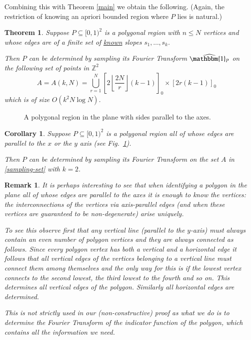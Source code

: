 \documentclass[12pt,a4paper,oneside]{amsart}
\newtheorem{theorem}{Theorem}[section]
\newtheorem{corollary}{Corollary}[section]
\newtheorem{remark}{Remark}[section]
\theoremstyle{definition}
\newcommand{\Floor}[1]{{\left\lfloor{#1}\right\rfloor}}
\newcommand{\ZZ}{{\mathbb Z}}
\newcommand{\one}{{\mathbbm{1}}}
\newcommand{\ft}[1]{\widehat{#1}}
\newcommand{\red}[1]{{#1}}
\newcounter{rem}
\begin{document}
Combining this with Theorem \ref{main} we obtain the following.
\red{(Again, the restriction of knowing an apriori bounded region where $P$ lies is natural.)}

\begin{theorem}\label{polygons}
Suppose $P \subseteq [0, 1)^2$ is a polygonal region with $n \le N$ vertices and whose edges are of a finite set of \underline{known} slopes $s_1, \ldots, s_k$.

Then $P$ can be determined by sampling its Fourier Transform $\ft{\one_P}$ on the following set of points in $\ZZ^2$
\begin{equation}\label{sampling-set}
A = A(k, N) = \bigcup_{r=1}^N \left[ 2\Floor{\frac{2 N}{r}} (k-1) \right]_0 \times [2r(k-1)]_0
\end{equation}
which is of size $O(k^2 N \log N)$.
\end{theorem}

\begin{figure}[h]
 
 \caption{A polygonal region in the plane with sides parallel to the axes.}\label{fig:ortho}
\end{figure}



\begin{corollary}\label{orthopolygons}
Suppose $P \subseteq [0, 1)^2$ is a polygonal region all of whose edges are parallel to the $x$ or the $y$ axis (see Fig.\ \ref{fig:ortho}).

Then $P$ can be determined by sampling its Fourier Transform on the set $A$ in \eqref{sampling-set} with $k=2$.
\end{corollary}

\begin{remark}
It is perhaps interesting to see that when identifying a polygon in the plane all of whose edges are parallel to the axes it is enough to know the vertices: the interconnections of the vertices via axis-parallel edges (and when these vertices are guaranteed to be non-degenerate) arise uniquely.

To see this observe first that any vertical line (parallel to the $y$-axis) must always contain an even number of polygon vertices and they are always connected as follows. Since every polygon vertex has both a vertical and a horizontal edge it follows that all vertical edges of the vertices belonging to a vertical line must connect them among themselves and the only way for this is if the lowest vertex connects to the second lowest, the third lowest to the fourth and so on. This determines all vertical edges of the polygon. Similarly all horizontal edges are determined.

This is not strictly used in our (non-constructive) proof as what we do is to determine the Fourier Transform of the indicator function of the polygon, which contains all the information we need.
\end{remark}
\end{document}
